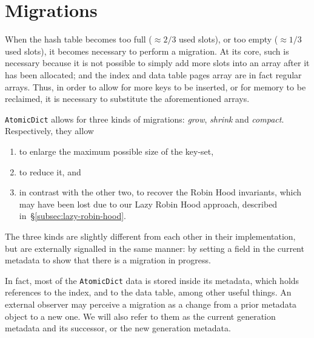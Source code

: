 \section{Migrations}\label{sec:migrations}

When the hash table becomes too full ($\approx 2/3$ used slots), or too empty ($\approx 1/3$ used slots), it becomes necessary to perform a migration.
At its core, such is necessary because it is not possible to simply add more slots into an array after it has been allocated; and the index and data table pages array are in fact regular arrays.
Thus, in order to allow for more keys to be inserted, or for memory to be reclaimed, it is necessary to substitute the aforementioned arrays.

\texttt{AtomicDict} allows for three kinds of migrations: \emph{grow}, \emph{shrink} and \emph{compact}.
Respectively, they allow
\begin{enumerate}
	\item to enlarge the maximum possible size of the key-set,
	\item to reduce it, and
	\item in contrast with the other two, to recover the Robin Hood invariants, which may have been lost due to our Lazy Robin Hood approach, described in~\S\ref{subsec:lazy-robin-hood}.
\end{enumerate}
The three kinds are slightly different from each other in their implementation, but are externally signalled in the same manner: by setting a field in the current metadata to show that there is a migration in progress.

In fact, most of the \texttt{AtomicDict} data is stored inside its metadata, which holds references to the index, and to the data table, among other useful things.
An external observer may perceive a migration as a change from a prior metadata object to a new one.
We will also refer to them as the current generation metadata and its successor, or the new generation metadata.


